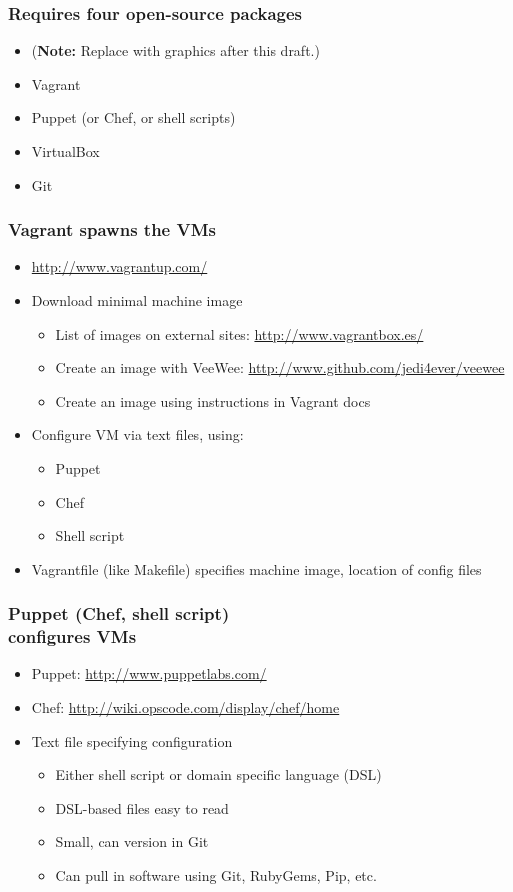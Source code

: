 \documentclass [14pt]{beamer}
\begin{document}
\begin{frame}
\frametitle{Requires four open-source packages}
\begin{itemize}
\item (\textbf{Note:} Replace with graphics after this draft.)
\item Vagrant
\item Puppet (or Chef, or shell scripts)
\item VirtualBox
\item Git
\end{itemize}
\end{frame}

\begin{frame}
\frametitle{Vagrant spawns the VMs}
\begin{itemize}
\item \url{http://www.vagrantup.com/}
\item Download minimal machine image
\begin{itemize}
\item List of images on external sites: \url{http://www.vagrantbox.es/}
\item Create an image with VeeWee:
  \url{http://www.github.com/jedi4ever/veewee}
\item Create an image using instructions in Vagrant docs
\end{itemize}
\item Configure VM via text files, using:
\begin{itemize}
\item Puppet
\item Chef
\item Shell script  
\end{itemize}
\item Vagrantfile (like Makefile) specifies machine image, location of config files
\end{itemize}
\end{frame}

\begin{frame}
\frametitle{Puppet (Chef, shell script)\\
configures VMs}
\begin{itemize}
\item Puppet: \url{http://www.puppetlabs.com/}
\item Chef: \url{http://wiki.opscode.com/display/chef/home}
\item Text file specifying configuration
\begin{itemize}
\item Either shell script or domain specific language (DSL)
\item DSL-based files easy to read
\item Small, can version in Git
\item Can pull in software using Git, RubyGems, Pip, etc.
\end{itemize}
\end{itemize}
\end{frame}
\end{document}
